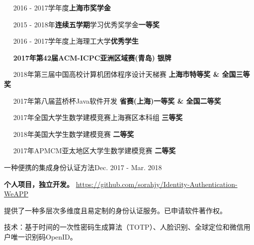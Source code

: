 \documentclass{sorahjy_cv}
\begin{document}


%
%



%
%

\begin{description}{}
	\item{\ \ } 2016 - 2017学年度\textbf{上海市奖学金}
	\item{\ \ } 2015 - 2018年\textbf{连续五学期}学习优秀奖学金\textbf{一等奖}
	\item{\ \ } 2016 - 2017学年度上海理工大学\textbf{优秀学生}
	\item{\ \ } \textbf{2017年第42届ACM-ICPC亚洲区域赛(青岛)} \hfill \textbf{银牌}
	\item{\ \ } 2018年第三届中国高校计算机团体程序设计天梯赛 \hfill \textbf{上海市特等奖 \& 全国三等奖}
	\item{\ \ } 2017年第八届蓝桥杯Java软件开发 \hfill \textbf{省赛(上海)一等奖 \& 全国二等奖}
	\item{\ \ } 2017年全国大学生数学建模竞赛上海赛区本科组 \hfill \textbf{三等奖}
	\item{\ \ } 2018年美国大学生数学建模竞赛 \hfill \textbf{二等奖}
	\item{\ \ } 2017年APMCM亚太地区大学生数学建模竞赛 \hfill \textbf{二等奖}

\end{description}


%
%


\begin{sectionContentSimple}{一种便携的集成身份认证方法}{Dec. 2017 - Mar. 2018}
	\item \textbf{个人项目，独立开发。} \url{https://github.com/sorahjy/Identity-Authentication-WeAPP}
	\item 提供了一种多层次多维度且易定制的身份认证服务。已申请软件著作权。
	\item 技术：基于时间的一次性密码生成算法（TOTP）、人脸识别、全球定位和微信用户唯一识别码OpenID。
\end{sectionContentSimple}
\end{document}
